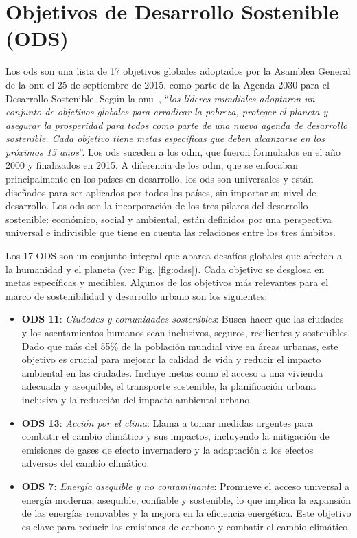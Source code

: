 \section{Objetivos de Desarrollo Sostenible (ODS)}
	Los \acrlong{ods} son una lista de 17 objetivos globales adoptados por la Asamblea General de la \acrfull{onu} el 25 de septiembre de 2015, como parte de la Agenda 2030 para el Desarrollo Sostenible. Según la \acrshort{onu}~\cite{un_sustainable_development}, ``\textit{los líderes mundiales adoptaron un conjunto de objetivos globales para erradicar la pobreza, proteger el planeta y asegurar la prosperidad para todos como parte de una nueva agenda de desarrollo sostenible. Cada objetivo tiene metas específicas que deben alcanzarse en los próximos 15 años}''.		
	Los \acrshort{ods} suceden a los \acrfull{odm}, que fueron formulados en el año 2000 y finalizados en 2015. A diferencia de los \acrshort{odm}, que se enfocaban principalmente en los países en desarrollo, los \acrshort{ods} son universales y están diseñados para ser aplicados por todos los países, sin importar su nivel de desarrollo. Los \acrlong{ods} son la incorporación de los tres pilares del desarrollo sostenible: económico, social y ambiental, están definidos por una perspectiva universal e indivisible que tiene en cuenta las relaciones entre los tres ámbitos.

	Los 17 ODS son un conjunto integral que abarca desafíos globales que afectan a la humanidad y el planeta (ver Fig. \ref{fig:odss}). Cada objetivo se desglosa en metas específicas y medibles. Algunos de los objetivos más relevantes para el marco de sostenibilidad y desarrollo urbano son los siguientes:
	\begin{itemize}
		\item \textbf{ODS 11}: \textit{Ciudades y comunidades sostenibles}: Busca hacer que las ciudades y los asentamientos humanos sean inclusivos, seguros, resilientes y sostenibles. Dado que más del 55\% de la población mundial vive en áreas urbanas, este objetivo es crucial para mejorar la calidad de vida y reducir el impacto ambiental en las ciudades. Incluye metas como el acceso a una vivienda adecuada y asequible, el transporte sostenible, la planificación urbana inclusiva y la reducción del impacto ambiental urbano.

		\item \textbf{ODS 13}: \textit{Acción por el clima}: Llama a tomar medidas urgentes para combatir el cambio climático y sus impactos, incluyendo la mitigación de emisiones de gases de efecto invernadero y la adaptación a los efectos adversos del cambio climático.

		\item \textbf{ODS 7}: \textit{Energía asequible y no contaminante}: Promueve el acceso universal a energía moderna, asequible, confiable y sostenible, lo que implica la expansión de las energías renovables y la mejora en la eficiencia energética. Este objetivo es clave para reducir las emisiones de carbono y combatir el cambio climático.

	\end{itemize}


